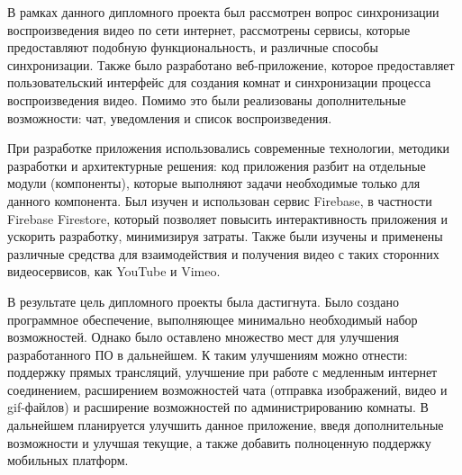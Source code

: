  
В рамках данного дипломного проекта был рассмотрен вопрос синхронизации воспроизведения видео по сети интернет, рассмотрены сервисы, которые предоставляют подобную функциональность, и различные способы синхронизации. Также было разработано веб-приложение, которое предоставляет пользовательский интерфейс для создания комнат и синхронизации процесса воспроизведения видео. Помимо это были реализованы дополнительные возможности: чат, уведомления и список воспроизведения.
 
При разработке приложения использовались современные технологии, методики разработки и архитектурные решения: код приложения разбит на отдельные модули (компоненты), которые выполняют задачи необходимые только для данного компонента. Был изучен и использован сервис Firebase, в частности Firebase Firestore, который позволяет повысить интерактивность приложения и ускорить разработку, минимизируя затраты. Также были изучены и применены различные средства для взаимодействия и получения видео с таких сторонних видеосервисов, как YouTube и Vimeo.
 
В результате цель дипломного проекты была дастигнута.
Было создано программное обеспечение, выполняющее минимально необходимый набор возможностей.
Однако было оставлено множество мест для улучшения разработанного ПО в дальнейшем. К таким улучшениям можно отнести: поддержку прямых трансляций, улучшение при работе с медленным интернет соединением, расширением возможностей чата (отправка изображений, видео и gif-файлов) и расширение возможностей по администрированию комнаты. В дальнейшем планируется улучшить данное приложение, введя дополнительные возможности и улучшая текущие, а также добавить полноценную поддержку мобильных платформ.
